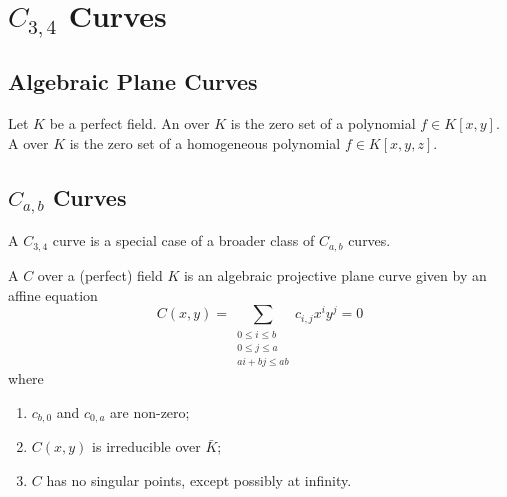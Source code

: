 
\section{$C_{3,4}$ Curves}
\label{chap_curves}




\subsection{Algebraic Plane Curves}

Let $K$ be a perfect field.
An  over $K$ is the zero set of a polynomial $f \in K[x,y]$.
A  over $K$ is the zero set of a homogeneous polynomial $f \in K[x,y,z]$.




\subsection{$C_{a,b}$ Curves}

A $C_{3,4}$ curve is a special case of a broader class of $C_{a,b}$ curves.

\begin{definition}
  A  $C$ over a (perfect) field $K$
  is an algebraic projective plane curve
  given by an affine equation
  \[ C(x,y) = \sum_{\substack{0 \leq i \leq b \\ 0 \leq j \leq a \\ ai + bj \leq ab }}c_{i,j}x^iy^j = 0 \]
  where
  \begin{enumerate}[label=(\roman*)]
    \item $c_{b,0}$ and $c_{0,a}$ are non-zero;
    \item $C(x,y)$ is irreducible over $\bar K$;
    \item $C$ has no singular points, except possibly at infinity.
  \end{enumerate}
\end{definition}



